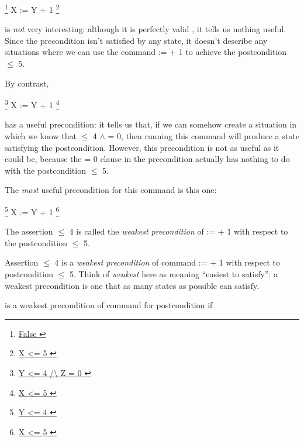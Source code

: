 \documentclass[12pt]{report}
\begin{document}
      \footnote{\url{ False }}  X := Y + 1  \footnote{\url{ X <= 5 }}


    is \textit{not} very interesting: although it is perfectly valid , it
    tells us nothing useful.  Since the precondition isn't
    satisfied by any state, it doesn't describe any situations where
    we can use the command  :=  + 1 to achieve the postcondition
     \ensuremath{\le} 5.


    By contrast,


      \footnote{\url{ Y <= 4 /\ Z = 0 }}  X := Y + 1 \footnote{\url{ X <= 5 }}


    has a useful precondition: it tells us that, if we can somehow
    create a situation in which we know that  \ensuremath{\le} 4 \ensuremath{\land}  = 0, then
    running this command will produce a state satisfying the
    postcondition.  However, this precondition is not as useful as it
    could be, because the  = 0 clause in the precondition actually
    has nothing to do with the postcondition  \ensuremath{\le} 5.


    The \textit{most} useful precondition for this command is this one:


      \footnote{\url{ Y <= 4 }}  X := Y + 1  \footnote{\url{ X <= 5 }}


    The assertion  \ensuremath{\le} 4 is called the \textit{weakest precondition} of
     :=  + 1 with respect to the postcondition  \ensuremath{\le} 5. 

 Assertion  \ensuremath{\le} 4 is a \textit{weakest precondition} of command  :=
     + 1 with respect to postcondition  \ensuremath{\le} 5.  Think of \textit{weakest}
    here as meaning ``easiest to satisfy'': a weakest precondition is
    one that as many states as possible can satisfy. 

  is a weakest precondition of command  for postcondition 
    if
\end{document}
